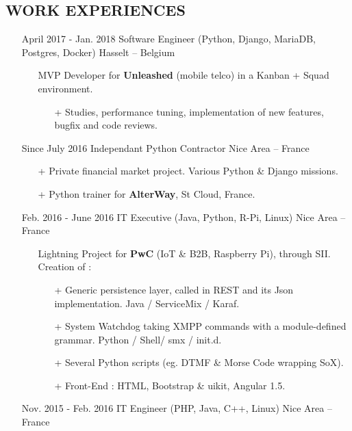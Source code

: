 \documentclass{res}
\begin{document}
\begin{resume}
\section{WORK EXPERIENCES}
        \begin{itemize}
					\item[] April 2017 - Jan. 2018 \tabto{5cm} Software Engineer (Python, Django, MariaDB, Postgres, Docker) \hfill Hasselt -- Belgium
					\begin{itemize}
						\item[] MVP Developer for  \textbf{Unleashed} (mobile telco) in a Kanban + Squad environment.
						\begin{itemize}
							\item[+] Studies, performance tuning, implementation of new features, bugfix and code reviews.
						\end{itemize}
					\end{itemize}
					\item[] Since July 2016 \tabto{5cm} Independant Python Contractor \hfill Nice Area -- France
					\begin{itemize}
						\item[+] Private financial market project. Various Python \& Django missions.
						\item[+] Python trainer for \textbf{AlterWay}, St Cloud, France.
					\end{itemize}
					\item[] Feb. 2016 - June 2016 \tabto{5cm} IT Executive (Java, Python, R-Pi, Linux) \hfill Nice Area -- France
					\begin{itemize}
						\item[] Lightning Project for \textbf{PwC} (IoT \& B2B, Raspberry Pi), through SII. Creation of :
						\begin{itemize}
							\item[+] Generic persistence layer, called in REST and its Json implementation. Java / ServiceMix / Karaf.
							\item[+] System Watchdog taking XMPP commands with a module-defined grammar. Python / Shell/ smx / init.d.
							\item[+] Several Python scripts (eg. DTMF \& Morse Code wrapping SoX). 
							\item[+] Front-End : HTML, Bootstrap \& uikit, Angular 1.5.
						\end{itemize}
					\end{itemize}
								\item[] Nov. 2015 - Feb. 2016 \tabto{5cm} IT Engineer (PHP, Java, C++, Linux) \hfill Nice Area -- France

\end{itemize}
\end{resume}
\end{document}
